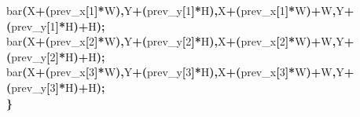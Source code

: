\documentclass[a4paper, 10pt]{article}
\newcommand\SPC{\hspace*{0.6em}}
\newcommand{\CppAIdentifier}[1]{#1}
\newcommand{\CppANumber}[1]{\textcolor[rgb]{0.5,0,0.5}{#1}}
\newcommand{\CppASpace}[1]{\colorbox[rgb]{1,1,1}{#1}}
\newcommand{\CppASymbol}[1]{\textbf{\textcolor[rgb]{1,0,0}{#1}}}
\begin{document}
\begin{ttfamily}
\CppASpace{\SPC }\CppAIdentifier{bar}\CppASymbol{(}\CppAIdentifier{X}\CppASymbol{+}\CppASymbol{(}\CppAIdentifier{prev\_x}\CppASymbol{[}\CppANumber{1}\CppASymbol{]}\CppASymbol{*}\CppAIdentifier{W}\CppASymbol{)}\CppASymbol{,}\CppAIdentifier{Y}\CppASymbol{+}\CppASymbol{(}\CppAIdentifier{prev\_y}\CppASymbol{[}\CppANumber{1}\CppASymbol{]}\CppASymbol{*}\CppAIdentifier{H}\CppASymbol{)}\CppASymbol{,}\CppAIdentifier{X}\CppASymbol{+}\CppASymbol{(}\CppAIdentifier{prev\_x}\CppASymbol{[}\CppANumber{1}\CppASymbol{]}\CppASymbol{*}\CppAIdentifier{W}\CppASymbol{)}\CppASymbol{+}\CppAIdentifier{W}\CppASymbol{,}\CppAIdentifier{Y}\CppASymbol{+}\CppASymbol{(}\CppAIdentifier{prev\_y}\CppASymbol{[}\CppANumber{1}\CppASymbol{]}\CppASymbol{*}\CppAIdentifier{H}\CppASymbol{)}\CppASymbol{+}\CppAIdentifier{H}\CppASymbol{)}\CppASymbol{;}\\
\CppASpace{\SPC }\CppAIdentifier{bar}\CppASymbol{(}\CppAIdentifier{X}\CppASymbol{+}\CppASymbol{(}\CppAIdentifier{prev\_x}\CppASymbol{[}\CppANumber{2}\CppASymbol{]}\CppASymbol{*}\CppAIdentifier{W}\CppASymbol{)}\CppASymbol{,}\CppAIdentifier{Y}\CppASymbol{+}\CppASymbol{(}\CppAIdentifier{prev\_y}\CppASymbol{[}\CppANumber{2}\CppASymbol{]}\CppASymbol{*}\CppAIdentifier{H}\CppASymbol{)}\CppASymbol{,}\CppAIdentifier{X}\CppASymbol{+}\CppASymbol{(}\CppAIdentifier{prev\_x}\CppASymbol{[}\CppANumber{2}\CppASymbol{]}\CppASymbol{*}\CppAIdentifier{W}\CppASymbol{)}\CppASymbol{+}\CppAIdentifier{W}\CppASymbol{,}\CppAIdentifier{Y}\CppASymbol{+}\CppASymbol{(}\CppAIdentifier{prev\_y}\CppASymbol{[}\CppANumber{2}\CppASymbol{]}\CppASymbol{*}\CppAIdentifier{H}\CppASymbol{)}\CppASymbol{+}\CppAIdentifier{H}\CppASymbol{)}\CppASymbol{;}\\
\CppASpace{\SPC }\CppAIdentifier{bar}\CppASymbol{(}\CppAIdentifier{X}\CppASymbol{+}\CppASymbol{(}\CppAIdentifier{prev\_x}\CppASymbol{[}\CppANumber{3}\CppASymbol{]}\CppASymbol{*}\CppAIdentifier{W}\CppASymbol{)}\CppASymbol{,}\CppAIdentifier{Y}\CppASymbol{+}\CppASymbol{(}\CppAIdentifier{prev\_y}\CppASymbol{[}\CppANumber{3}\CppASymbol{]}\CppASymbol{*}\CppAIdentifier{H}\CppASymbol{)}\CppASymbol{,}\CppAIdentifier{X}\CppASymbol{+}\CppASymbol{(}\CppAIdentifier{prev\_x}\CppASymbol{[}\CppANumber{3}\CppASymbol{]}\CppASymbol{*}\CppAIdentifier{W}\CppASymbol{)}\CppASymbol{+}\CppAIdentifier{W}\CppASymbol{,}\CppAIdentifier{Y}\CppASymbol{+}\CppASymbol{(}\CppAIdentifier{prev\_y}\CppASymbol{[}\CppANumber{3}\CppASymbol{]}\CppASymbol{*}\CppAIdentifier{H}\CppASymbol{)}\CppASymbol{+}\CppAIdentifier{H}\CppASymbol{)}\CppASymbol{;}\\
\CppASymbol{\}}\\

\end{ttfamily}
\end{document}
